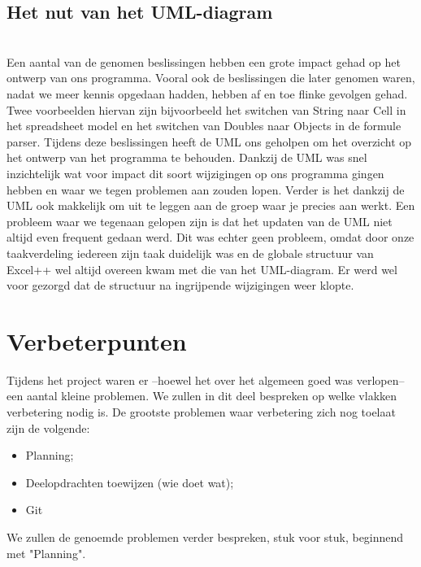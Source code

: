 \documentclass[a4paper,11pt]{article}
\begin{document}
\subsection{Het nut van het UML-diagram}\mbox{}\\
Een aantal van de genomen beslissingen hebben een grote impact gehad op het ontwerp van ons programma. Vooral ook de beslissingen die later genomen waren, nadat we meer kennis opgedaan hadden, hebben af en toe flinke gevolgen gehad. Twee voorbeelden hiervan zijn bijvoorbeeld het switchen van String naar Cell in het spreadsheet model en het switchen van Doubles naar Objects in de formule parser. Tijdens deze beslissingen heeft de UML ons geholpen om het overzicht op het ontwerp van het programma te behouden. Dankzij de UML was snel inzichtelijk wat voor impact dit soort wijzigingen op ons programma gingen hebben en waar we tegen problemen aan zouden lopen. Verder is het dankzij de UML ook makkelijk om uit te leggen aan de groep waar je precies aan werkt.
Een probleem waar we tegenaan gelopen zijn is dat het updaten van de UML niet altijd even frequent gedaan werd. Dit was echter geen probleem, omdat door onze taakverdeling iedereen zijn taak duidelijk was en de globale structuur van Excel++ wel altijd overeen kwam met die van het UML-diagram. Er werd wel voor gezorgd dat de structuur na ingrijpende wijzigingen weer klopte.

\newpage\section{Verbeterpunten}
Tijdens het project waren er –hoewel het over het algemeen goed was verlopen– een aantal kleine problemen. We zullen in dit deel bespreken op welke vlakken verbetering nodig is.
De grootste problemen waar verbetering zich nog toelaat zijn de volgende:

\begin{itemize}
	\item Planning;
	\item Deelopdrachten toewijzen (wie doet wat);
	\item Git
\end{itemize}

We zullen de genoemde problemen verder bespreken, stuk voor stuk, beginnend met "Planning".
\end{document}
